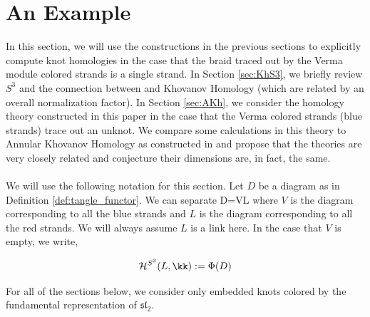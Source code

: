 \documentclass{article}
\begin{document}
\section{An Example}\label{sec:example}
In this section, we will use the constructions in the previous sections to explicitly compute knot homologies in the case that the braid traced out by the Verma module colored strands is a single strand. In Section \ref{sec:KhS3}, we briefly review $S^3$ and the connection between \cite{Web} and Khovanov Homology \cite{Kh} (which are related by an overall normalization factor). In Section \ref{sec:AKh}, we consider the homology theory constructed in this paper in the case that the Verma colored strands (blue strands) trace out an unknot. We compare some calculations in this theory to Annular Khovanov Homology as constructed in \cite{APS} and propose that the theories are very closely related and conjecture their dimensions are, in fact, the same. \\ \\
We will use the following notation for this section. Let $D$ be a diagram as in Definition \ref{def:tangle_functor}. We can separate 
\be D=V\cup L \label{eq:diag_decomp}\ee
where $V$ is the diagram corresponding to all the blue strands and $L$ is the diagram corresponding to all the red strands. We will always assume $L$ is a link here. In the case that $V$ is empty, we write, 

$$\mathcal{H}^{S^3}(L,\kk):=\Phi(D) $$


\begin{rem}For all of the sections below, we consider only embedded knots colored by the fundamental representation of $\mathfrak{sl_2}$. 
\end{rem}
\end{document}
